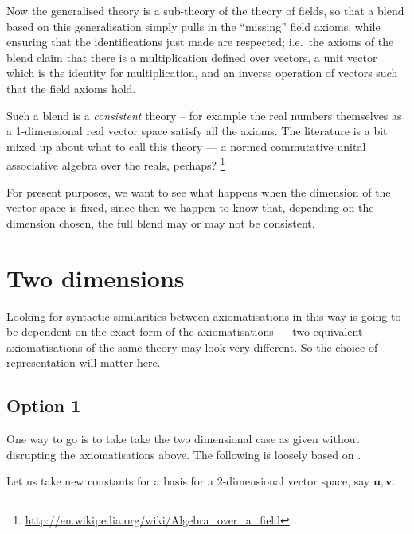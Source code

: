 \documentclass{my-blue-book}
\newcommand{\vecU}{\mathbf{u}}
\newcommand{\vecV}{\mathbf{v}}
\begin{document}
Now the generalised theory is a sub-theory of the theory of fields,
so that a blend based on this generalisation simply pulls
in the ``missing'' field axioms, while ensuring that the
identifications just made are respected; i.e.\ the axioms
of the blend claim that there is a multiplication defined
over vectors, a unit vector which is the identity for multiplication,
and an inverse operation of vectors such that the field axioms hold.

Such a blend is a \emph{consistent} theory -- for example
the real numbers themselves as a 1-dimensional real vector
space satisfy all the axioms. The literature is a bit
mixed up about what to call this theory --- a normed
commutative unital associative algebra over the reals, perhaps?%
\footnote{\url{http://en.wikipedia.org/wiki/Algebra_over_a_field}}


For present purposes, we want
to see what happens when the dimension of the vector space
is fixed, since then we happen to know that, depending on the
dimension chosen, the full blend may or may not be consistent.

\section{Two dimensions}
\label{sec:two-dimensions}

Looking for syntactic similarities between axiomatisations in this way
is going to be dependent on the exact form of the axiomatisations ---
two equivalent axiomatisations of the same theory may look very
different.  So the choice of representation will matter here.

\subsection{Option 1}
\label{sec:option-1}

One way to go is to take take the two dimensional case as given
without disrupting the axiomatisations above.  The following is
loosely based on \cite{HalmosFDVS}.

Let us take new constants for a basis for a 2-dimensional vector space,
say $\vecU,\vecV$.
\end{document}
